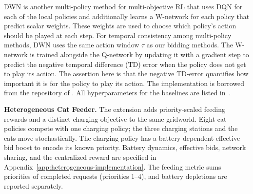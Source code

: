 DWN is another multi-policy method for multi-objective RL that uses DQN for each of the local policies and additionally learns a W-network for each policy that predict scalar weights. 
These weights are used to choose which policy's action should be played at each step. 
For temporal consistency among multi-policy methods, DWN uses the same action window \(\tau\) as our bidding methods.
The W-network is trained alongside the Q-network by updating it with a gradient step to predict the negative temporal difference (TD) error when the policy does not get to play its action.
The assertion here is that the negative TD-error quantifies how important it is for the policy to play its action. 
The implementation is borrowed from the repository of \citep{rosero2024multi}. All hyperparameters for the baselines are listed in~.

\textbf{Heterogeneous Cat Feeder.}
The extension adds priority-scaled feeding rewards and a distinct charging objective to the same gridworld.
Eight cat policies compete with one charging policy; the three charging stations and the cats move stochastically.
The charging policy has a battery-dependent effective bid boost to encode its known priority.
Battery dynamics, effective bids, network sharing, and the centralized reward are specified in Appendix~\ref{app:heterogeneous-implementation}.
The feeding metric sums priorities of completed requests (priorities 1--4), and battery depletions are reported separately.
